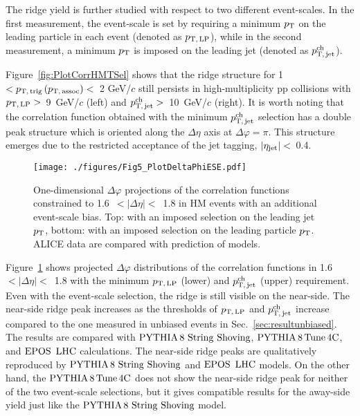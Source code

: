 The ridge yield is further studied with respect to two different event-scales. In the first measurement, the event-scale is set by requiring a minimum $p_\mathrm{T}$ on the leading particle in each event (denoted as $p_\mathrm{T,\,LP}$), while in the second measurement, a minimum $p_\mathrm{T}$ is imposed on the leading jet (denoted as $p_\mathrm{T,\,jet}^\mathrm{ch}$). 

Figure~\ref{fig:PlotCorrHMTSel} shows that the ridge structure for 1~$< p_\mathrm{T,\,trig}\,(p_\mathrm{T,\,assoc}) <$~2 GeV/$c$ still persists in high-multiplicity pp collisions with $p_\mathrm{T,\,LP}>$~9~GeV/$c$ (left) and $p_\mathrm{T,\,jet}^\mathrm{ch}>$~10~GeV/$c$ (right).  It is worth noting that the correlation function obtained with the minimum $p_\mathrm{T,\,jet}^\mathrm{ch}$ selection has a double peak structure which is oriented along the $\Delta\eta$ axis at $\Delta\varphi=\pi$. This structure emerges due to the restricted acceptance of the jet tagging, $|\eta_{\rm{jet}}|<$~0.4.

\begin{figure}[h!]
	\centering
	\texttt{[image: ./figures/Fig5\_PlotDeltaPhiESE.pdf]}
	\caption{ One-dimensional $\Delta\varphi$ projections of the correlation functions constrained to 1.6~$<|\Delta\eta|<$~1.8 in HM events with an additional event-scale bias. Top: with an imposed selection on the leading jet $p_\mathrm{T}$,  bottom: with an imposed selection on the leading particle $p_\mathrm{T}$. ALICE data are compared with prediction of models.}
	\label{fig:PlotDeltaPhiESE}
\end{figure}

Figure~\ref{fig:PlotDeltaPhiESE} shows projected $\Delta\varphi$ distributions of the correlation functions in 1.6~$<|\Delta\eta|<$~1.8 with the minimum $p_\mathrm{T,\,LP}$ (lower) and $p_\mathrm{T,\,jet}^\mathrm{ch}$ (upper) requirement. Even with the event-scale selection, the ridge is still visible on the near-side. The near-side ridge peak increases as the thresholds of $p_\mathrm{T,\,LP}$ and $p_\mathrm{T,\,jet}^\mathrm{ch}$ increase compared to the one measured in unbiased events in Sec.~\ref{sec:resultunbiased}. The results are compared with ${\mathrm{PYTHIA}\,8~\mathrm{String}~}\mathrm{Shoving}$, $\mathrm{PYTHIA}\,8\,\mathrm{Tune\,4C}$, and ${\mathrm{EPOS}\,~\mathrm{LHC}}$ calculations. The near-side ridge peaks are qualitatively reproduced by ${\mathrm{PYTHIA}\,8~\mathrm{String}~}\mathrm{Shoving}$ and ${\mathrm{EPOS}\,~\mathrm{LHC}}$ models. On the other hand, the $\mathrm{PYTHIA}\,8\,\mathrm{Tune\,4C}$ does not show the  near-side ridge peak for neither of the two event-scale selections, but it gives compatible results for the away-side yield just like the ${\mathrm{PYTHIA}\,8~\mathrm{String}~}\mathrm{Shoving}$ model.


